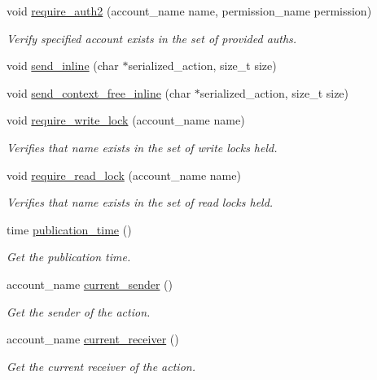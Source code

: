 \begin{DoxyCompactItemize}
\item 
void \mbox{\hyperlink{group__actioncapi_gace44cd21e660827634c0529077f9494c}{require\+\_\+auth2}} (account\+\_\+name name, permission\+\_\+name permission)
\begin{DoxyCompactList}\small\item\em Verify specified account exists in the set of provided auths. \end{DoxyCompactList}\item 
void \mbox{\hyperlink{group__actioncapi_gada68da99a95a5b25e9f5d43af255c63e}{send\+\_\+inline}} (char $\ast$serialized\+\_\+action, size\+\_\+t size)
\item 
void \mbox{\hyperlink{group__actioncapi_ga30b1cab2d60f843eb2d496e754e41705}{send\+\_\+context\+\_\+free\+\_\+inline}} (char $\ast$serialized\+\_\+action, size\+\_\+t size)
\item 
void \mbox{\hyperlink{group__actioncapi_ga9893f539cf6d56989eb6e0d4ce51a813}{require\+\_\+write\+\_\+lock}} (account\+\_\+name name)
\begin{DoxyCompactList}\small\item\em Verifies that name exists in the set of write locks held. \end{DoxyCompactList}\item 
void \mbox{\hyperlink{group__actioncapi_ga4b02a9d9adf71ae49e77e19fefc0cbf4}{require\+\_\+read\+\_\+lock}} (account\+\_\+name name)
\begin{DoxyCompactList}\small\item\em Verifies that name exists in the set of read locks held. \end{DoxyCompactList}\item 
time \mbox{\hyperlink{group__actioncapi_ga761ba259bec8bbdab79b31b716a5d4d6}{publication\+\_\+time}} ()
\begin{DoxyCompactList}\small\item\em Get the publication time. \end{DoxyCompactList}\item 
account\+\_\+name \mbox{\hyperlink{group__actioncapi_gaf531fda07a825ca8b0d90f21446e6a64}{current\+\_\+sender}} ()
\begin{DoxyCompactList}\small\item\em Get the sender of the action. \end{DoxyCompactList}\item 
account\+\_\+name \mbox{\hyperlink{group__actioncapi_ga5fcca014b53b0f15b9f9636325bae976}{current\+\_\+receiver}} ()
\begin{DoxyCompactList}\small\item\em Get the current receiver of the action. \end{DoxyCompactList}\end{DoxyCompactItemize}


